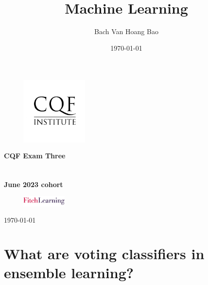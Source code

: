\documentclass[11pt]{article}
\title{Machine Learning}
\author{Bach Van Hoang Bao}
\date{\today}
\makeatletter
\edef\mytitle{\@title}
\edef\myself{\@author}
\makeatother
\begin{document}
\begin{titlepage}
    
    \begin{center}

        \begin{figure}[!htb]
            \centering
            \includegraphics[width=0.3\textwidth]{exam4_3_files/cqf_logo.png}
        \end{figure}
     
        \huge \textbf{CQF Exam Three}\\
        \vspace{0.5cm}
        \Large \textbf{\mytitle}\\
        \vspace{0.7cm}
        \large \textbf{\myself}\\
        \vspace{0.2cm}
        \textbf{June 2023 cohort}\\ 

        \mbox{}
        \vfill

        \begin{figure}[!htb]
            \centering
            \includegraphics[width=0.2\textwidth]{exam4_3_files/FitchLearning_logo.png}
        \end{figure}

        \today
    \end{center}

\end{titlepage} 
    
    

    
    \hypertarget{what-are-voting-classifiers-in-ensemble-learning}{%
\section{What are voting classifiers in ensemble
learning?}\label{what-are-voting-classifiers-in-ensemble-learning}}
\end{document}
